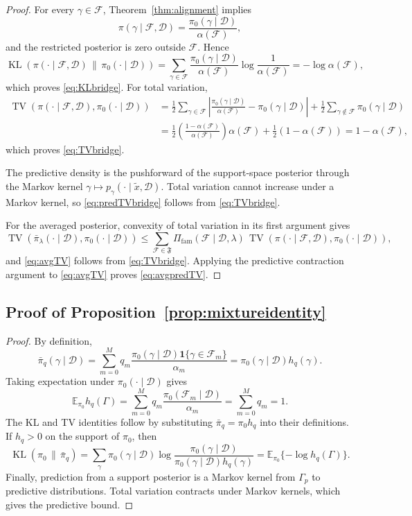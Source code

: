 \documentclass[twoside,11pt]{article}
\newcommand{\D}{\mathcal{D}}
\newcommand{\F}{\mathcal{F}}
\newcommand{\Fp}{\mathfrak{F}}
\newcommand{\E}{\mathbb{E}}
\newcommand{\ind}{\mathbf{1}}
\newcommand{\TV}{\operatorname{TV}}
\newcommand{\KL}{\operatorname{KL}}
\begin{document}
\begin{proof} For every $\gamma \in \F$, Theorem~\ref{thm:alignment} implies
\[
\pi(\gamma \mid \F,\D) = \frac{\pi_0(\gamma \mid \D)}{\alpha(\F)},
\]
and the restricted posterior is zero outside $\F$. Hence
\[
\KL\!\left(\pi(\cdot \mid \F,\D)\,\|\,\pi_0(\cdot \mid \D)\right) = \sum_{\gamma \in \F} \frac{\pi_0(\gamma \mid \D)}{\alpha(\F)} \log \frac{1}{\alpha(\F)} = -\log \alpha(\F),
\]
which proves \eqref{eq:KLbridge}. For total variation,
\begin{align*}
\TV\left(\pi(\cdot\mid\F,\D),\pi_0(\cdot\mid\D)\right)&=\frac{1}{2}\sum_{\gamma\in\F}\left|\frac{\pi_0(\gamma\mid\D)}{\alpha(\F)}-\pi_0(\gamma\mid\D)\right|+\frac{1}{2}\sum_{\gamma\notin\F}\pi_0(\gamma\mid\D)\\
&=\frac{1}{2}\left(\frac{1-\alpha(\F)}{\alpha(\F)}\right)\alpha(\F)+\frac{1}{2}(1-\alpha(\F))=1-\alpha(\F),
\end{align*}
which proves \eqref{eq:TVbridge}.

The predictive density is the pushforward of the support-space posterior through the Markov kernel $\gamma \mapsto p_\gamma(\cdot \mid \tilde x,\D)$. Total variation cannot increase under a Markov kernel, so \eqref{eq:predTVbridge} follows from \eqref{eq:TVbridge}.

For the averaged posterior, convexity of total variation in its first argument gives
\[
\TV\!\left(\bar\pi_\lambda(\cdot \mid \D),\pi_0(\cdot \mid \D)\right) \le \sum_{\F \in \Fp} \Pi_{\mathrm{fam}}(\F \mid \D,\lambda)\, \TV\!\left(\pi(\cdot \mid \F,\D),\pi_0(\cdot \mid \D)\right),
\]
and \eqref{eq:avgTV} follows from \eqref{eq:TVbridge}. Applying the predictive contraction argument to \eqref{eq:avgTV} proves \eqref{eq:avgpredTV}.
\end{proof}

\subsection{Proof of Proposition~\ref{prop:mixtureidentity}}

\begin{proof} By definition,
\[
\bar\pi_q(\gamma\mid\D) = \sum_{m=0}^M q_m \frac{\pi_0(\gamma\mid\D)\ind\{\gamma\in\F_m\}}{\alpha_m} = \pi_0(\gamma\mid\D)h_q(\gamma).
\]
Taking expectation under $\pi_0(\cdot\mid\D)$ gives
\[
\E_{\pi_0}h_q(\Gamma) = \sum_{m=0}^M q_m \frac{\pi_0(\F_m\mid\D)}{\alpha_m} = \sum_{m=0}^M q_m =1.
\]
The KL and TV identities follow by substituting $\bar\pi_q=\pi_0h_q$ into their definitions. If $h_q>0$ on the support of $\pi_0$, then
\[
\KL(\pi_0\,\|\,\bar\pi_q) = \sum_\gamma \pi_0(\gamma\mid\D) \log\frac{\pi_0(\gamma\mid\D)}{\pi_0(\gamma\mid\D)h_q(\gamma)} = \E_{\pi_0}\{-\log h_q(\Gamma)\}.
\]
Finally, prediction from a support posterior is a Markov kernel from $\Gamma_p$ to predictive distributions. Total variation contracts under Markov kernels, which gives the predictive bound.
\end{proof}
\end{document}
